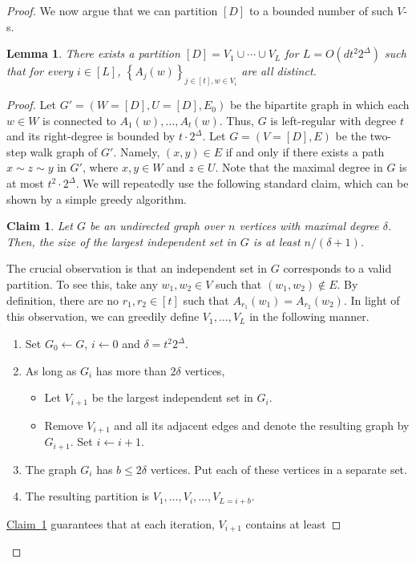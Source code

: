 \documentclass[11pt]{article}
\numberwithin{equation}{section}
\newtheorem{lemma}[theorem]{Lemma}
\newtheorem{claim}[theorem]{Claim}
\theoremstyle{definition}
\theoremstyle{plain}
\newcommand{\expref}[2]{\hyperref[#2]{#1~\ref{#2}}}
\newcommand{\adv}{A}
\newcommand{\set}[1]{\left\{{#1}\right\}}
\begin{document}
\begin{proof}
We now argue that we can partition $[D]$ to a bounded number of such $V$-s.
\begin{lemma}
There exists a partition $[D] = V_1 \cup \cdots \cup V_L$ for $L = O(dt^2  2^{\Delta})$
such that for every $i \in [L]$, $\set{A_{j}(w)}_{j \in [t],w \in V_i}$ are all distinct.
\end{lemma}
\begin{proof}
Let $G' = (W = [D],U = [D],E_0)$ be the bipartite graph in which each $w \in W$ is
connected to $\adv_{1}(w),\ldots,\adv_{t}(w)$. Thus, $G$ is left-regular with degree $t$
and its right-degree is bounded by $t \cdot 2^{\Delta}$. Let $G = (V = [D],E)$ be the
two-step walk graph of $G'$. Namely, $(x,y) \in E$ if and only if there exists a path
$x \sim z \sim y$ in $G'$, where $x,y \in W$ and $z \in U$. 
Note that the maximal degree in $G$ is at most $t^{2} \cdot 2^{\Delta}$.
We will repeatedly use
the following standard claim, which can be shown by a simple greedy algorithm.
\begin{claim}\label{claim:aux}
Let $G$ be an undirected graph over $n$ vertices with maximal degree $\delta$.
Then, the size of the largest independent set in $G$ is at least 
%
%
$n/(\delta+1)$.
%
%
%
\end{claim}
The crucial observation is that an independent set in $G$ corresponds to a valid partition.
To see this, take any $w_1,w_2 \in V$ such that $(w_1,w_2) \notin E$. By definition, there are no
$r_1,r_2 \in [t]$ such that $\adv_{r_1}(w_1) = \adv_{r_2}(w_2)$. In light of this observation,
we can greedily define $V_1,\ldots,V_{L}$ in the following manner.
\begin{enumerate}
\item	Set $G_0 \leftarrow G$, $i \leftarrow 0$ and $\delta = t^{2}2^{\Delta}$.
\item	As long as $G_i$ has more than $2\delta$ vertices,
\begin{itemize}
\item	Let $V_{i+1}$ be the largest independent set in $G_{i}$.
\item	Remove $V_{i+1}$ and all its adjacent edges and denote the resulting graph by $G_{i+1}$.
Set $i \leftarrow i+1$.
\end{itemize} 
\item	The graph $G_i$ has $b \le 2\delta$ vertices. Put each of these vertices in a separate
set.
\item	The resulting partition is $V_{1},\ldots,V_{i},\ldots,V_{L = i+b}$.
\end{enumerate}
\expref{Claim}{claim:aux} guarantees that at each iteration, $V_{i+1}$ contains at least 

\end{proof}
\end{proof}
\end{document}
